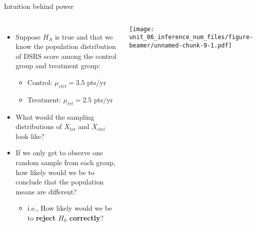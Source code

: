 \documentclass[
  ignorenonframetext,
  aspectratio=169]{beamer}
\newcommand{\columnsbegin}{\begin{columns}}
\newcommand{\columnsend}{\end{columns}}
\begin{document}
\begin{frame}{Intuition behind power}
\protect\hypertarget{intuition-behind-power}{}
\columnsbegin


\footnotesize

\begin{itemize}
\item
  Suppose \(H_A\) is true and that we know the population distribution
  of DSRS score among the control group and treatment group:

  \begin{itemize}

    \footnotesize

    \item Control: $\mu_{ctrl} = 3.5$ pts/yr

    \item Treatment: $\mu_{trt} = 2.5$ pts/yr

    \end{itemize}
\item
  What would the sampling distributions of \(\overline{X}_{trt}\) and
  \(\overline{X}_{ctrl}\) look like?
\item
  If we only get to observe one random sample from each group, how
  likely would we be to conclude that the population means are
  different?

  \begin{itemize}

    \footnotesize

    \item i.e., How likely would we be to \textbf{reject $H_0$ correctly}?

    \end{itemize}
\end{itemize}


\texttt{[image: unit\_06\_inference\_num\_files/figure-beamer/unnamed-chunk-9-1.pdf]}

\columnsend
\end{frame}
\end{document}
